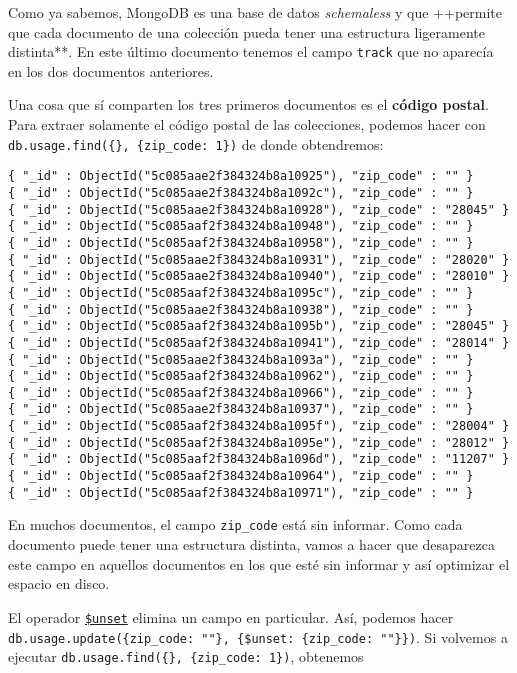 \documentclass[]{article}
\begin{document}
Como ya sabemos, MongoDB es una base de datos \emph{schemaless} y que
++permite que cada documento de una colección pueda tener una estructura
ligeramente distinta**. En este último documento tenemos el campo
\texttt{track} que no aparecía en los dos documentos anteriores.

Una cosa que sí comparten los tres primeros documentos es el
\textbf{código postal}. Para extraer solamente el código postal de las
colecciones, podemos hacer con
\texttt{db.usage.find(\{\},\ \{zip\_code:\ 1\})} de donde obtendremos:

\begin{verbatim}
{ "_id" : ObjectId("5c085aae2f384324b8a10925"), "zip_code" : "" }
{ "_id" : ObjectId("5c085aae2f384324b8a1092c"), "zip_code" : "" }
{ "_id" : ObjectId("5c085aae2f384324b8a10928"), "zip_code" : "28045" }
{ "_id" : ObjectId("5c085aaf2f384324b8a10948"), "zip_code" : "" }
{ "_id" : ObjectId("5c085aaf2f384324b8a10958"), "zip_code" : "" }
{ "_id" : ObjectId("5c085aae2f384324b8a10931"), "zip_code" : "28020" }
{ "_id" : ObjectId("5c085aae2f384324b8a10940"), "zip_code" : "28010" }
{ "_id" : ObjectId("5c085aaf2f384324b8a1095c"), "zip_code" : "" }
{ "_id" : ObjectId("5c085aae2f384324b8a10938"), "zip_code" : "" }
{ "_id" : ObjectId("5c085aaf2f384324b8a1095b"), "zip_code" : "28045" }
{ "_id" : ObjectId("5c085aaf2f384324b8a10941"), "zip_code" : "28014" }
{ "_id" : ObjectId("5c085aae2f384324b8a1093a"), "zip_code" : "" }
{ "_id" : ObjectId("5c085aaf2f384324b8a10962"), "zip_code" : "" }
{ "_id" : ObjectId("5c085aaf2f384324b8a10966"), "zip_code" : "" }
{ "_id" : ObjectId("5c085aae2f384324b8a10937"), "zip_code" : "" }
{ "_id" : ObjectId("5c085aaf2f384324b8a1095f"), "zip_code" : "28004" }
{ "_id" : ObjectId("5c085aaf2f384324b8a1095e"), "zip_code" : "28012" }
{ "_id" : ObjectId("5c085aaf2f384324b8a1096d"), "zip_code" : "11207" }
{ "_id" : ObjectId("5c085aaf2f384324b8a10964"), "zip_code" : "" }
{ "_id" : ObjectId("5c085aaf2f384324b8a10971"), "zip_code" : "" }
\end{verbatim}

En muchos documentos, el campo \texttt{zip\_code} está sin informar.
Como cada documento puede tener una estructura distinta, vamos a hacer
que desaparezca este campo en aquellos documentos en los que esté sin
informar y así optimizar el espacio en disco.

El operador
\href{https://docs.mongodb.com/manual/reference/operator/update/unset/}{\texttt{\$unset}}
elimina un campo en particular. Así, podemos hacer
\texttt{db.usage.update(\{zip\_code:\ ""\},\ \{\$unset:\ \{zip\_code:\ ""\}\})}.
Si volvemos a ejecutar \texttt{db.usage.find(\{\},\ \{zip\_code:\ 1\})},
obtenemos
\end{document}
